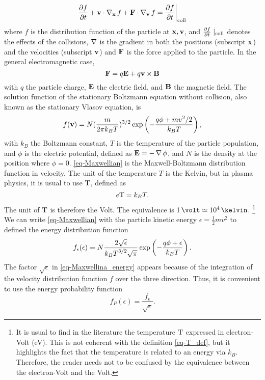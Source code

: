 \begin{equation} \label{eq-boltzmann}
\frac{\partial f}{\partial t}  + {\mathbf v} \cdot \operatorname{{\mathbf \nabla}}_{{\mathbf x}} f + {\mathbf F} \cdot  \operatorname{{\mathbf \nabla}}_{{\mathbf v}} f = \frac{\partial f}{\partial t}  \bigg\vert_{\rm coll} 
\end{equation}
where $f$ is the distribution function of the particle at ${\mathbf x}, {\mathbf v}$, and $\frac{\partial f}{\partial t}\mid_{\rm coll}$ denotes the effects of the collisions, $\operatorname{{\mathbf \nabla}}$ is the gradient in both the positions (subscript ${\mathbf x}$) and the velocities (subscript ${\mathbf v}$)  and ${\mathbf F}$ is the force applied to the particle.
In the general electromagnetic case,
\begin{equation*} \label{eq-forceEM}
  {\mathbf F} =  q {\mathbf E} + q {\mathbf v} \times {\mathbf B}
\end{equation*}
with $q$ the particle charge, ${\mathbf E}$ the electric field, and ${\mathbf B}$ the magnetic field.
The solution function of the stationary Boltzmann equation without collision, also known as the stationary Vlasov equation, is
\begin{equation} \label{eq-Maxwellian}
  f({\mathbf v}) = N (\frac{m}{2 \pi k_B T})^{3/2} \exp \left( - \frac{q \phi + m v^2/2}{k_B T } \right),
\end{equation}
with $k_B$ the Boltzmann constant, $T$ is the temperature of the particle population, and $\phi$ is the electric potential, defined as ${\mathbf E} = -\operatorname{{\mathbf \nabla}} \phi$, and $N$ is the density at the position where $\phi = 0$.
\cref{eq-Maxwellian} is the Maxwell-Boltzmann distribution function in velocity.
The unit of the temperature $T$ is the Kelvin, but in plasma physics, it is usual to use ${\rm T}$, defined as
\begin{equation} \label{eq-T_def}
  e {\rm T} = k_B T.
\end{equation}
The unit of ${\rm T}$ is therefore the Volt.
The equivalence is $1 \,\volt \simeq 10^4 \,\kelvin$.
\footnote{It is usual to find in the literature the temperature ${\rm T}$ expressed in electron-Volt (eV).
This is not coherent with the definition \cref{eq-T_def}, but it highlights the fact that the temperature is related to an energy via $k_B$. Therefore, the reader needs not to be confused by the equivalence between the electron-Volt and the Volt.  }
We can write \cref{eq-Maxwellian} with the particle kinetic energy $\epsilon = \frac{1}{2} m v^2$ to defined the energy distribution function
\begin{equation} \label{eq-Maxwellina_energy}
  f_{\epsilon}(\epsilon) = N \frac{2 \sqrt{\epsilon}}{{k_B T}^{3/2} \sqrt{\pi}} \exp \left(- \frac{q \phi + \epsilon}{k_B T} \right).
\end{equation}
The factor $\sqrt{\epsilon}$ in \cref{eq-Maxwellina_energy} appears because of the integration of the velocity distribution function $f$ over the three direction.
Thus, it is convenient to use the energy probability function 
\begin{equation} \label{eq-EPF}
  f_P(\epsilon) = \frac{f_{\epsilon}}{\sqrt{\epsilon}}.
\end{equation}

